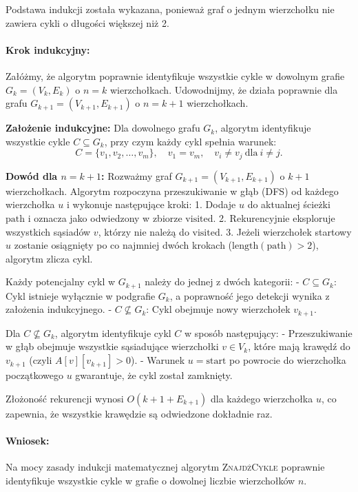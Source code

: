Podstawa indukcji została wykazana, ponieważ graf o jednym wierzchołku nie zawiera cykli o długości większej niż 2.

\paragraph{Krok indukcyjny:}
Załóżmy, że algorytm poprawnie identyfikuje wszystkie cykle w dowolnym grafie \( G_k = (V_k, E_k) \) o \( n = k \) wierzchołkach. Udowodnijmy, że działa poprawnie dla grafu \( G_{k+1} = (V_{k+1}, E_{k+1}) \) o \( n = k+1 \) wierzchołkach.

\textbf{Założenie indukcyjne:} 
Dla dowolnego grafu \( G_k \), algorytm identyfikuje wszystkie cykle \( C \subseteq G_k \), przy czym każdy cykl spełnia warunek:
\[
C = \{v_1, v_2, \dots, v_m\}, \quad v_1 = v_m, \quad v_i \neq v_j \ \text{dla} \ i \neq j.
\]

\textbf{Dowód dla \( n = k+1 \):}
Rozważmy graf \( G_{k+1} = (V_{k+1}, E_{k+1}) \) o \( k+1 \) wierzchołkach. Algorytm rozpoczyna przeszukiwanie w głąb (DFS) od każdego wierzchołka \( u \) i wykonuje następujące kroki:
1. Dodaje \( u \) do aktualnej ścieżki \( \text{path} \) i oznacza jako odwiedzony w zbiorze \( \text{visited} \).
2. Rekurencyjnie eksploruje wszystkich sąsiadów \( v \), którzy nie należą do \( \text{visited} \).
3. Jeżeli wierzchołek startowy \( u \) zostanie osiągnięty po co najmniej dwóch krokach (\( \text{length}(\text{path}) > 2 \)), algorytm zlicza cykl.

Każdy potencjalny cykl w \( G_{k+1} \) należy do jednej z dwóch kategorii:
- \( C \subseteq G_k \): Cykl istnieje wyłącznie w podgrafie \( G_k \), a poprawność jego detekcji wynika z założenia indukcyjnego.
- \( C \not\subseteq G_k \): Cykl obejmuje nowy wierzchołek \( v_{k+1} \).

Dla \( C \not\subseteq G_k \), algorytm identyfikuje cykl \( C \) w sposób następujący:
- Przeszukiwanie w głąb obejmuje wszystkie sąsiadujące wierzchołki \( v \in V_k \), które mają krawędź do \( v_{k+1} \) (czyli \( A[v][v_{k+1}] > 0 \)).
- Warunek \( u = \text{start} \) po powrocie do wierzchołka początkowego \( u \) gwarantuje, że cykl został zamknięty.

Złożoność rekurencji wynosi \( O(k+1 + E_{k+1}) \) dla każdego wierzchołka \( u \), co zapewnia, że wszystkie krawędzie są odwiedzone dokładnie raz.

\paragraph{Wniosek:}
Na mocy zasady indukcji matematycznej algorytm \textsc{ZnajdźCykle} poprawnie identyfikuje wszystkie cykle w grafie o dowolnej liczbie wierzchołków \( n \).


